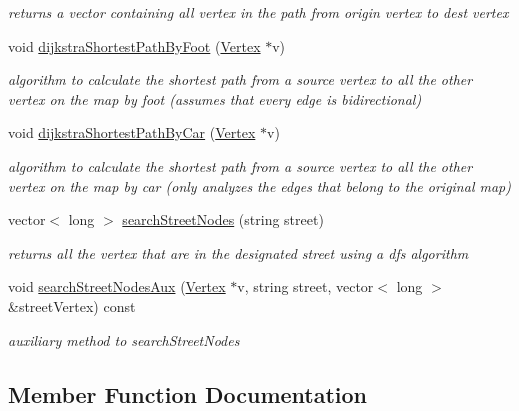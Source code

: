 \begin{DoxyCompactItemize}
\begin{DoxyCompactList}\small\item\em returns a vector containing all vertex in the path from origin vertex to dest vertex \end{DoxyCompactList}\item 
void \hyperlink{class_graph_a3364873245a79903515c5cbcb502a479}{dijkstra\+Shortest\+Path\+By\+Foot} (\hyperlink{class_vertex}{Vertex} $\ast$v)
\begin{DoxyCompactList}\small\item\em algorithm to calculate the shortest path from a source vertex to all the other vertex on the map by foot (assumes that every edge is bidirectional) \end{DoxyCompactList}\item 
void \hyperlink{class_graph_a2005ebde6efc1ec28733fafe6a346ccb}{dijkstra\+Shortest\+Path\+By\+Car} (\hyperlink{class_vertex}{Vertex} $\ast$v)
\begin{DoxyCompactList}\small\item\em algorithm to calculate the shortest path from a source vertex to all the other vertex on the map by car (only analyzes the edges that belong to the original map) \end{DoxyCompactList}\item 
vector$<$ long $>$ \hyperlink{class_graph_ae9f070d976df3f47d55246bd7268f160}{search\+Street\+Nodes} (string street)
\begin{DoxyCompactList}\small\item\em returns all the vertex that are in the designated street using a dfs algorithm \end{DoxyCompactList}\item 
void \hyperlink{class_graph_a8a9ef8edc2355fe125d5c306ee6eceaa}{search\+Street\+Nodes\+Aux} (\hyperlink{class_vertex}{Vertex} $\ast$v, string street, vector$<$ long $>$ \&street\+Vertex) const
\begin{DoxyCompactList}\small\item\em auxiliary method to search\+Street\+Nodes \end{DoxyCompactList}\end{DoxyCompactItemize}


\subsection{Member Function Documentation}
\hypertarget{class_graph_a88d5bbd58c00151b0adc7b0c21c4fcd9}{}\label{class_graph_a88d5bbd58c00151b0adc7b0c21c4fcd9} 
